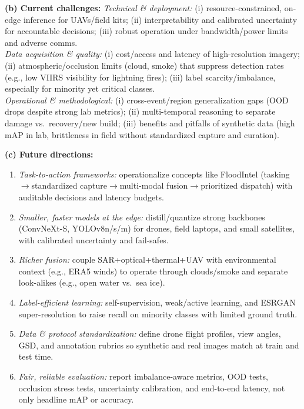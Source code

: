 \documentclass[conference,a4paper]{IEEEtran}
\begin{document}
\noindent\hspace*{1em}\textbf{(b) Current challenges:}
\textit{Technical \& deployment:} (i) resource-constrained, on-edge inference for UAVs/field kits; (ii) interpretability and calibrated uncertainty for accountable decisions; (iii) robust operation under bandwidth/power limits and adverse comms.\\
\textit{Data acquisition \& quality:} (i) cost/access and latency of high-resolution imagery; (ii) atmospheric/occlusion limits (cloud, smoke) that suppress detection rates (e.g., low VIIRS visibility for lightning fires); (iii) label scarcity/imbalance, especially for minority yet critical classes.\\
\textit{Operational \& methodological:} (i) cross-event/region generalization gaps (OOD drops despite strong lab metrics); (ii) multi-temporal reasoning to separate damage vs.\ recovery/new build; (iii) benefits and pitfalls of synthetic data (high mAP in lab, brittleness in field without standardized capture and curation).

\noindent\hspace*{1em}\textbf{(c) Future directions:}
\begin{enumerate}
  \item \textit{Task-to-action frameworks:} operationalize concepts like FloodIntel (tasking$\rightarrow$standardized capture$\rightarrow$multi-modal fusion$\rightarrow$prioritized dispatch) with auditable decisions and latency budgets.
  \item \textit{Smaller, faster models at the edge:} distill/quantize strong backbones (ConvNeXt-S, YOLOv8n/s/m) for drones, field laptops, and small satellites, with calibrated uncertainty and fail-safes.
  \item \textit{Richer fusion:} couple SAR+optical+thermal+UAV with environmental context (e.g., ERA5 winds) to operate through clouds/smoke and separate look-alikes (e.g., open water vs.\ sea ice).
  \item \textit{Label-efficient learning:} self-supervision, weak/active learning, and ESRGAN super-resolution to raise recall on minority classes with limited ground truth.
  \item \textit{Data \& protocol standardization:} define drone flight profiles, view angles, GSD, and annotation rubrics so synthetic and real images match at train and test time.
  \item \textit{Fair, reliable evaluation:} report imbalance-aware metrics, OOD tests, occlusion stress tests, uncertainty calibration, and end-to-end latency, not only headline mAP or accuracy.
\end{enumerate}
\end{document}
